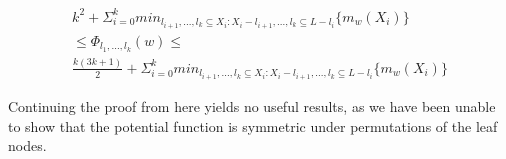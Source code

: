 \begin{equation*}
    \begin{gathered}
        k^2 + \Sigma_{i=0}^k min_{l_{i+1}, ..., l_k \subseteq X_i : X_i - l_{i+1}, ..., l_k \subseteq L - l_i} \{ m_w(X_i)\} \\
        \leq \Phi_{l_1, ..., l_k} (w) \leq  \\
        \frac{k(3k+1)}{2} + \Sigma_{i=0}^k min_{l_{i+1}, ..., l_k \subseteq X_i : X_i - l_{i+1}, ..., l_k \subseteq L - l_i} \{ m_w(X_i)\}
    \end{gathered}
\end{equation*}

Continuing the proof from here yields no useful results, as we have been unable to show that the potential function is symmetric under permutations of the leaf nodes.